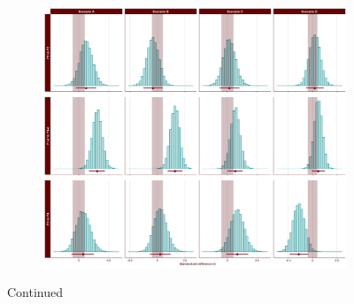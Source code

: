 \begin{appendix}
\medskip

\begin{figure}[ht]\ContinuedFloat
    \centering
    \begin{subfigure}{1\textwidth}
        \includegraphics[width=\linewidth]{Figures/SD2_proportion_scenario_comparisons_D.png}
        \label{fig:proportion-scenario-comparisons-D}
    \end{subfigure}
    \caption[]{Continued}
    \label{fig:proportion-scenario-comparisons}
\end{figure}


\end{appendix}
